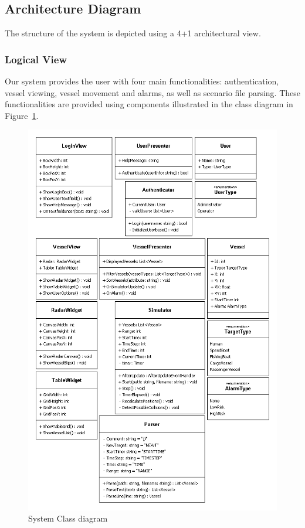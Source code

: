 \documentclass[12pt]{article}
\begin{document}
\subsection{Architecture Diagram}
\par
The structure of the system is depicted using a 4+1 architectural view.

\subsubsection{Logical View}
\par
Our system provides the user with four main functionalities: authentication, vessel viewing, 
vessel movement and alarms, as well as scenario file parsing. These functionalities are provided
using components illustrated in the class diagram in Figure~\ref{fig:UMLClassDiagram}.
\clearpage

\begin{figure}[h!]
    \centering
    \includegraphics[scale=0.75]{3_ClassDiagram}
    \caption{System Class diagram}
    \label{fig:UMLClassDiagram}
\end{figure}
\end{document}
